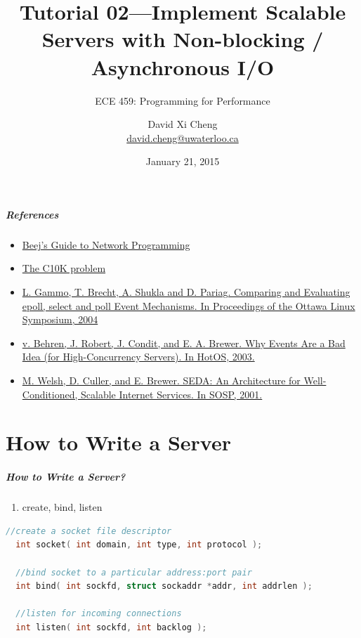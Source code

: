 \documentclass[aspectratio=43]{beamer}
\title{Tutorial 02---Implement Scalable Servers with Non-blocking / Asynchronous I/O}
\subtitle{ECE 459: Programming for Performance}
\author{David Xi Cheng \\ \href{mailto:david.cheng@uwaterloo.ca}{david.cheng@uwaterloo.ca}}
\institute{University of Waterloo}
\date{January 21, 2015}
\begin{document}
\begin{frame}[plain]
  \titlepage
\end{frame}

\begin{frame}
  \frametitle{References}

  \begin{itemize}
  	\item \href{http://beej.us/guide/bgnet/}{Beej's Guide to Network Programming}
  	\item \href{http://www.kegel.com/c10k.html}{The C10K problem}
	\item \href{https://cs.uwaterloo.ca/~brecht/papers/getpaper.php?file=ols-2004.pdf}{L. Gammo, T. Brecht, A. Shukla and D. Pariag. Comparing and Evaluating epoll, select and poll Event Mechanisms. In Proceedings of the Ottawa Linux Symposium, 2004}
	\item \href{https://www.usenix.org/legacy/events/hotos03/tech/full_papers/vonbehren/vonbehren.pdf}{v. Behren, J. Robert, J. Condit, and E. A. Brewer. Why Events Are a Bad Idea (for High-Concurrency Servers). In HotOS, 2003.}
	\item \href{http://www.eecs.harvard.edu/~mdw/papers/seda-sosp01.pdf}{M. Welsh, D. Culler, and E. Brewer. SEDA: An Architecture for Well-Conditioned, Scalable Internet Services. In SOSP, 2001.}
  \end{itemize}
  \end{frame}

\part{How to Write a Server}
\begin{frame}
\partpage
\end{frame}
\begin{frame}[fragile]
  \frametitle{How to Write a Server?}
  \begin{enumerate}
  	\item create, bind, listen 
  \end{enumerate}
  
  \begin{lstlisting}[language=C,basicstyle=\ttfamily\footnotesize,commentstyle=\color{commgreen},keywordstyle=\color{blue}]
  //create a socket file descriptor
  int socket( int domain, int type, int protocol );
 
  //bind socket to a particular address:port pair
  int bind( int sockfd, struct sockaddr *addr, int addrlen );
  
  //listen for incoming connections
  int listen( int sockfd, int backlog );
  \end{lstlisting}
\end{frame}
\end{document}

